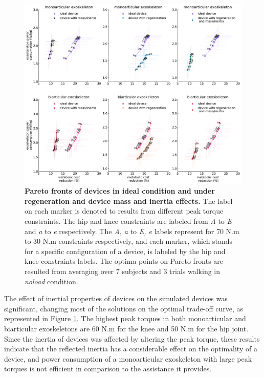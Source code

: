 \documentclass[10pt,letterpaper]{article}
\begin{document}
\begin{figure}[ht]   
	\centering
	\includegraphics[width=\linewidth]{Pareto_Mass_Regenration_Figures/PaperFigure_Pareto_Comparison.pdf}
	\vspace{1mm}
	\caption{{\small\textbf{Pareto fronts of devices in ideal condition and under regeneration and device mass and inertia effects.} The label on each marker is denoted to results from different peak torque constraints. The hip and knee constraints are labeled from {\it A} to {\it E} and {\it a} to {\it e} respectively. The {\it A, a} to {\it E, e} labels represent for 70 N.m to 30 N.m constraints respectively, and each marker, which stands for a specific configuration of a device, is labeled by the hip and knee constraints labels. The optima points on Pareto fronts are resulted from averaging over 7 subjects and 3 trials walking in {\it noload} condition.}}
	\label{Fig_Paretofronts_Mass_Regeneration_Effect_Comparison}
\end{figure}
\vspace{2mm}
The effect of inertial properties of devices on the simulated devices was significant, changing most of the solutions on the optimal trade-off curve, as represented in Figure \ref{Fig_Paretofronts_Mass_Regeneration_Effect_Comparison}. The highest peak torques in both monoarticular and biarticular exoskeletons are 60 N.m for the knee and 50 N.m for the hip joint. Since the inertia of devices was affected by altering the peak torque, these results indicate that the reflected inertia has a considerable effect on the optimality of a device, and power consumption of a monoarticular exoskeleton with large peak torques is not efficient in comparison to the assistance it provides.\\ 
\end{document}
